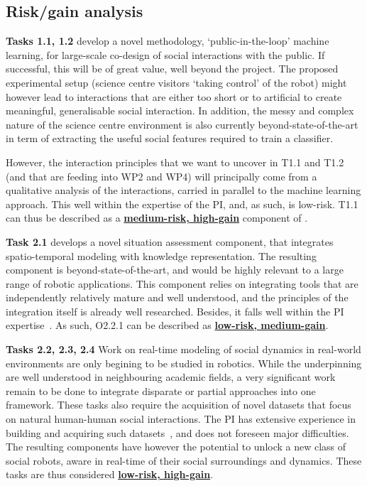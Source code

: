 \subsection{Risk/gain analysis}

\begin{rewrite}

\textbf{Tasks 1.1, 1.2} develop a novel methodology, `public-in-the-loop' machine
learning, for large-scale co-design of social interactions with the public. If
successful, this will be of great value, well beyond the project. The
proposed experimental setup (science centre visitors `taking control' of the robot)
might however lead to interactions that are either too short or to artificial to
create meaningful, generalisable social interaction. In addition, the messy and
complex nature of the science centre environment is also currently beyond-state-of-the-art
in term of extracting the useful social features required to train a classifier.

However, the interaction principles that we want to uncover in T1.1 and T1.2
(and that are feeding into WP2 and WP4) will principally come from a qualitative
analysis of the interactions, carried in parallel to the machine learning
approach. This well within the expertise of the PI, and, as such, is low-risk.
T1.1 can thus be described as a \ul{\bf medium-risk, high-gain} component of
\project.

\vspace{1em}

\textbf{Task 2.1} develops a novel situation assessment component, that
integrates spatio-temporal modeling with knowledge representation. The resulting
component is beyond-state-of-the-art, and would be highly relevant to a large range
of robotic applications. This component relies on integrating tools that are
independently relatively mature and well understood, and the principles of the
integration itself is already well researched. Besides, it falls well within the
PI
expertise~\cite{lemaignan2018underworlds,sallami2019simulation,lemaignan2010oro}.
As such, O2.2.1 can be described as \ul{\bf low-risk, medium-gain}.

\textbf{Tasks 2.2, 2.3, 2.4} Work on real-time modeling of social dynamics in
real-world environments are only begining to be studied in robotics. While the
underpinning are well understood in neighbouring academic fields, a very
significant work remain to be done to integrate disparate or partial approaches
into one framework. These tasks also require the acquisition of novel datasets
that focus on natural human-human social interactions. The PI has extensive
experience in building and acquiring such
datasets~\cite{lemaignan2018pinsoro,sallami2020unexpected}, and does not
foreseen major difficulties. The resulting components have however the potential
to unlock a new class of social robots, aware in real-time of their social
surroundings and dynamics.  These tasks are thus considered \ul{\bf low-risk,
high-gain}.


\end{rewrite}
